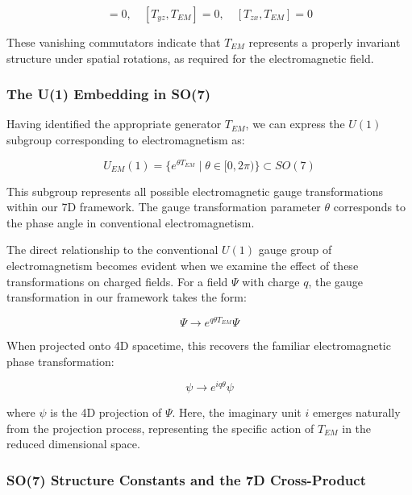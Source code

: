 \documentclass{article}
\begin{document}
\begin{equation}
[T_{xy}, T_{EM}] = 0, \quad [T_{yz}, T_{EM}] = 0, \quad [T_{zx}, T_{EM}] = 0
\end{equation}

These vanishing commutators indicate that $T_{EM}$ represents a properly invariant structure under spatial rotations, as required for the electromagnetic field.

\subsubsection{The U(1) Embedding in SO(7)}

Having identified the appropriate generator $T_{EM}$, we can express the $U(1)$ subgroup corresponding to electromagnetism as:

\begin{equation}
U_{EM}(1) = \{e^{\theta T_{EM}} \mid \theta \in [0, 2\pi)\} \subset SO(7)
\end{equation}

This subgroup represents all possible electromagnetic gauge transformations within our 7D framework. The gauge transformation parameter $\theta$ corresponds to the phase angle in conventional electromagnetism.

The direct relationship to the conventional $U(1)$ gauge group of electromagnetism becomes evident when we examine the effect of these transformations on charged fields. For a field $\Psi$ with charge $q$, the gauge transformation in our framework takes the form:

\begin{equation}
\Psi \rightarrow e^{q\theta T_{EM}} \Psi
\end{equation}

When projected onto 4D spacetime, this recovers the familiar electromagnetic phase transformation:

\begin{equation}
\psi \rightarrow e^{iq\theta} \psi
\end{equation}

where $\psi$ is the 4D projection of $\Psi$. Here, the imaginary unit $i$ emerges naturally from the projection process, representing the specific action of $T_{EM}$ in the reduced dimensional space.

\subsubsection{SO(7) Structure Constants and the 7D Cross-Product}
\end{document}
